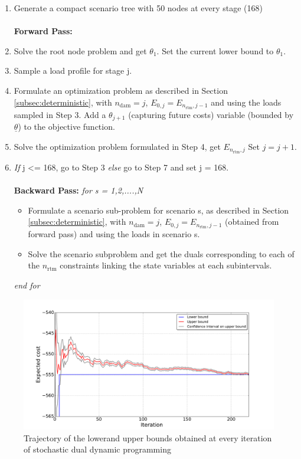 \documentclass[11pt,twoside]{article}
\begin{document}
\begin{enumerate}
\item Generate a compact scenario tree with 50 nodes at every stage (168)\\\\
\textbf{Forward Pass:}  
\item Solve the root node problem and get $\theta_1$. Set the current lower bound to $\theta_1$.
\item Sample a load profile for stage j. 
\item Formulate an optimization problem as described in Section \ref{subsec:deterministic}, with $n_\text{dam} = j$, $ E_{0, j} = E_{n_\text{rtm}, j-1}$ and using the loads sampled in Step 3. Add a $\theta_{j+1}$ (capturing future costs) variable (bounded by $\underline{\theta}$) to the objective function.   
\item Solve the optimization problem formulated in Step 4, get $E_{n_\text{rtm}, j}$ Set $j = j +1$. 
\item \emph{If} j <= 168, go to Step 3 \emph{else} go to Step 7 and set j = 168.\\\\
\textbf{Backward Pass:}
\emph{for s = 1,2,....,N}
\begin{itemize} 
\item Formulate a scenario sub-problem for scenario s, as described in Section  \ref{subsec:deterministic}, with $n_\text{dam} = j$, $E_{0, j} = E_{n_\text{rtm}, j-1}$ (obtained from forward pass) and using the loads in scenario s.
\item Solve the scenario subproblem and get the duals corresponding to each of the ${n_\text{rtm}}$ constraints linking the state variables at each subintervals. 
\end{itemize}
\emph{end for}
\end{enumerate}


\begin{figure}[h!]
\begin{center}
\includegraphics[scale=0.4]
{Figures/Plots/dualdynamic/bounds.pdf} \caption{Trajectory of the lowerand upper bounds obtained at every iteration of stochastic dual dynamic programming}\label{fig:bounds}\end{center}
\end{figure}
\end{document}
